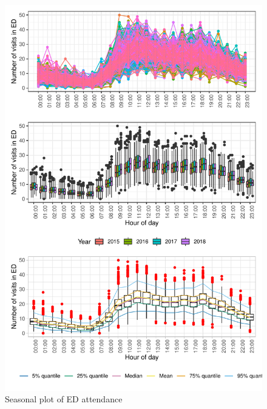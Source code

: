 \documentclass[]{elsarticle} %
\begin{document}
\begin{figure}[H]

{\centering \includegraphics{paper_files/figure-latex/hourly-plot-1} 

}

\caption{Seasonal plot of ED attendance}\label{fig:hourly-plot}
\end{figure}
\end{document}
